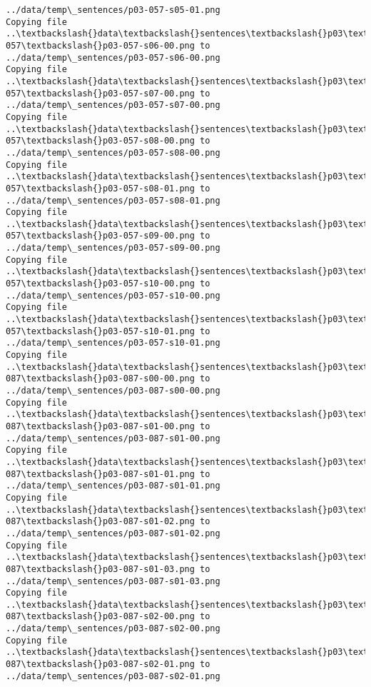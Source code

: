 \documentclass[11pt]{article}
\begin{document}
\begin{Verbatim}[commandchars=\\\{\}]
../data/temp\_sentences/p03-057-s05-01.png
Copying file ..\textbackslash{}data\textbackslash{}sentences\textbackslash{}p03\textbackslash{}p03-057\textbackslash{}p03-057-s06-00.png to
../data/temp\_sentences/p03-057-s06-00.png
Copying file ..\textbackslash{}data\textbackslash{}sentences\textbackslash{}p03\textbackslash{}p03-057\textbackslash{}p03-057-s07-00.png to
../data/temp\_sentences/p03-057-s07-00.png
Copying file ..\textbackslash{}data\textbackslash{}sentences\textbackslash{}p03\textbackslash{}p03-057\textbackslash{}p03-057-s08-00.png to
../data/temp\_sentences/p03-057-s08-00.png
Copying file ..\textbackslash{}data\textbackslash{}sentences\textbackslash{}p03\textbackslash{}p03-057\textbackslash{}p03-057-s08-01.png to
../data/temp\_sentences/p03-057-s08-01.png
Copying file ..\textbackslash{}data\textbackslash{}sentences\textbackslash{}p03\textbackslash{}p03-057\textbackslash{}p03-057-s09-00.png to
../data/temp\_sentences/p03-057-s09-00.png
Copying file ..\textbackslash{}data\textbackslash{}sentences\textbackslash{}p03\textbackslash{}p03-057\textbackslash{}p03-057-s10-00.png to
../data/temp\_sentences/p03-057-s10-00.png
Copying file ..\textbackslash{}data\textbackslash{}sentences\textbackslash{}p03\textbackslash{}p03-057\textbackslash{}p03-057-s10-01.png to
../data/temp\_sentences/p03-057-s10-01.png
Copying file ..\textbackslash{}data\textbackslash{}sentences\textbackslash{}p03\textbackslash{}p03-087\textbackslash{}p03-087-s00-00.png to
../data/temp\_sentences/p03-087-s00-00.png
Copying file ..\textbackslash{}data\textbackslash{}sentences\textbackslash{}p03\textbackslash{}p03-087\textbackslash{}p03-087-s01-00.png to
../data/temp\_sentences/p03-087-s01-00.png
Copying file ..\textbackslash{}data\textbackslash{}sentences\textbackslash{}p03\textbackslash{}p03-087\textbackslash{}p03-087-s01-01.png to
../data/temp\_sentences/p03-087-s01-01.png
Copying file ..\textbackslash{}data\textbackslash{}sentences\textbackslash{}p03\textbackslash{}p03-087\textbackslash{}p03-087-s01-02.png to
../data/temp\_sentences/p03-087-s01-02.png
Copying file ..\textbackslash{}data\textbackslash{}sentences\textbackslash{}p03\textbackslash{}p03-087\textbackslash{}p03-087-s01-03.png to
../data/temp\_sentences/p03-087-s01-03.png
Copying file ..\textbackslash{}data\textbackslash{}sentences\textbackslash{}p03\textbackslash{}p03-087\textbackslash{}p03-087-s02-00.png to
../data/temp\_sentences/p03-087-s02-00.png
Copying file ..\textbackslash{}data\textbackslash{}sentences\textbackslash{}p03\textbackslash{}p03-087\textbackslash{}p03-087-s02-01.png to
../data/temp\_sentences/p03-087-s02-01.png

\end{Verbatim}
\end{document}
